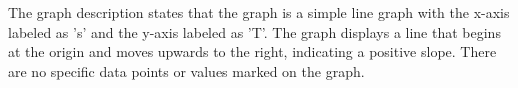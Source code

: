 The graph description states that the graph is a simple line graph with the x-axis labeled as 's' and the y-axis labeled as 'T'. The graph displays a line that begins at the origin and moves upwards to the right, indicating a positive slope. There are no specific data points or values marked on the graph.
